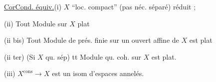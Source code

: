 \uline{Cor}\qquad \uline{Cond. équiv.}\quad (i) $X$ ``loc. compact'' (pas néc. séparé) réduit ;

(ii) Tout Module sur $X$ plat

(ii bis) Tout Module  de prés. finie sur un ouvert affine de $X$ est plat

(ii ter) (Si $X$ qu. sép) tt Module qu. coh. sur $X$  est plat.

(iii) $X^{\mathrm{cons}}\longrightarrow X$ est un isom d'espaces annelés.
